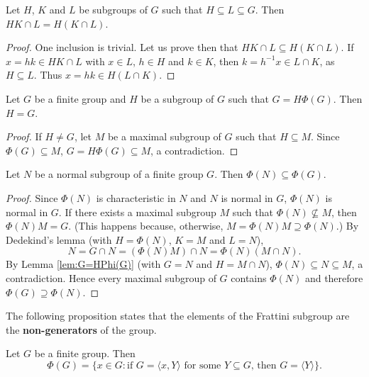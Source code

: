 \begin{lemma}[Dedekind]
\label{lem:Dedekind}
Let $H$, $K$ and $L$ be subgroups of $G$ 
such that $H\subseteq L\subseteq G$. Then 
$HK\cap L=H(K\cap L)$.
\end{lemma}

\begin{proof}
One inclusion is trivial. Let us prove then that 
$HK\cap L\subseteq H(K\cap L)$. If 
$x=hk\in HK\cap L$ with $x\in L$, $h\in H$ and $k\in K$, then 
$k=h^{-1}x\in L\cap K$, as $H\subseteq L$. Thus $x=hk\in H(L\cap
	K)$.
\end{proof}

\begin{lemma}
\label{lem:G=HPhi(G)}
Let $G$ be a finite group and $H$ be a subgroup of $G$ such that 
$G=H\Phi(G)$. Then $H=G$.
\end{lemma}

\begin{proof}
If $H\ne G$, let $M$ be a maximal subgroup of $G$ such that 
$H\subseteq M$. Since $\Phi(G)\subseteq M$, $G=H\Phi(G)\subseteq M$, a 
contradiction. 
\end{proof}

\begin{proposition}
\label{pro:phi(N)phi(G)}
Let $N$ be a normal subgroup of a finite group $G$. Then 
$\Phi(N)\subseteq\Phi(G)$.
\end{proposition}

\begin{proof}
Since $\Phi(N)$ is characteristic in $N$ and $N$ 
is normal in $G$, $\Phi(N)$ is normal in $G$. 
If there exists a maximal subgroup $M$ such that 
$\Phi(N)\not\subseteq M$, then $\Phi(N)M=G$. (This happens
because, otherwise, $M=\Phi(N)M\supseteq\Phi(N)$.) By Dedekind's lemma (with  $H=\Phi(N)$, $K=M$ and $L=N$), 
\[
N=G\cap N=(\Phi(N)M)\cap N=\Phi(N)(M\cap N).
\]
By Lemma \ref{lem:G=HPhi(G)} (with $G=N$ and $H=M\cap N$), 
$\Phi(N)\subseteq N\subseteq M$, a contradiction. 
Hence every maximal subgroup of $G$ contains $\Phi(N)$ and therefore 
$\Phi(G)\supseteq\Phi(N)$. 
\end{proof}

The following proposition states that the 
elements of the Frattini subgroup are the \textbf{non-generators} of 
the group. 

\begin{proposition}
	\label{pro:nongenerators}
	Let $G$ be a finite group. Then 
 	\[
	\Phi(G)=\{x\in G:\text{if $G=\langle x,Y\rangle$ for some $Y\subseteq G$, then $G=\langle Y\rangle$}\}.
	\]
\end{proposition}

